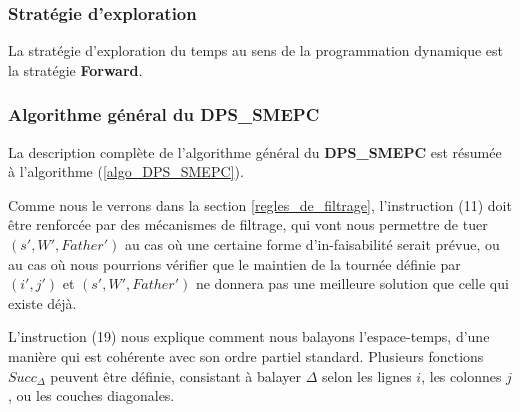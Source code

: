 \subsubsection{Stratégie d'exploration}
La stratégie d'exploration du temps au sens de la programmation dynamique est la stratégie \textbf{Forward}.
\subsubsection{Algorithme général du DPS\_SMEPC}

La description complète de l'algorithme général du \textbf{DPS\_SMEPC} est résumée à l'algorithme (\ref{algo_DPS_SMEPC}). 

Comme nous le verrons dans la section \ref{regles_de_filtrage}, l'instruction (11) doit être renforcée par des mécanismes de filtrage, qui vont nous permettre de tuer $(s', W', Father')$ au cas où une certaine forme d'in-faisabilité serait prévue, ou au cas où nous pourrions vérifier que le maintien de la tournée définie par $(i', j')$ et $(s', W', Father')$ ne donnera pas une meilleure solution que celle qui existe déjà.

L'instruction (19) nous explique comment nous balayons l'espace-temps, d'une manière qui est cohérente avec son ordre partiel standard. Plusieurs fonctions $Succ_{\Delta}$ peuvent être définie, consistant à balayer $\Delta$ selon les lignes $i$, les colonnes $j$, ou les couches diagonales.

